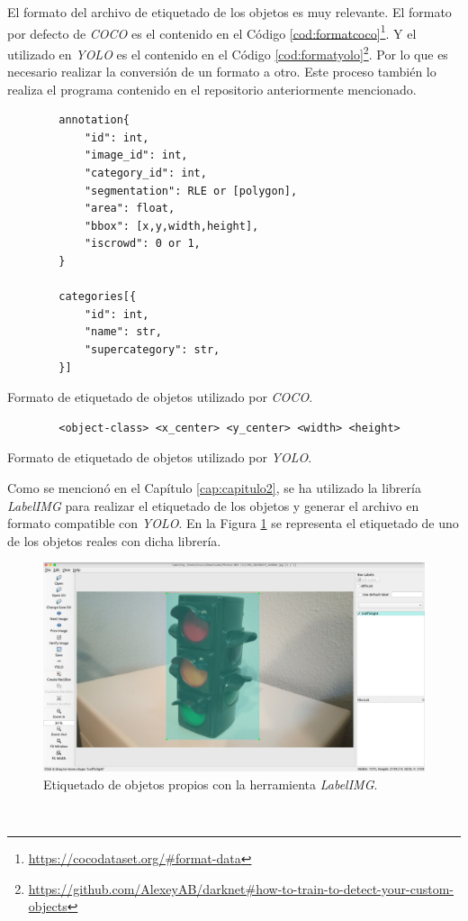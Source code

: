 El formato del archivo de etiquetado de los objetos es muy relevante. El formato por defecto de \textit{COCO} es el contenido en el Código \ref{cod:formatcoco}\footnote{\url{https://cocodataset.org/\#format-data}}. Y el utilizado en \textit{YOLO} es el contenido en el Código \ref{cod:formatyolo}\footnote{\url{https://github.com/AlexeyAB/darknet\#how-to-train-to-detect-your-custom-objects}}. Por lo que es necesario realizar la conversión de un formato a otro. Este proceso también lo realiza el programa contenido en el repositorio anteriormente mencionado.\\

\begin{code}[h]
	\begin{lstlisting}
		annotation{
			"id": int, 
			"image_id": int, 
			"category_id": int, 
			"segmentation": RLE or [polygon], 
			"area": float, 
			"bbox": [x,y,width,height], 
			"iscrowd": 0 or 1,
		}

		categories[{
			"id": int, 
			"name": str, 
			"supercategory": str,
		}]
	\end{lstlisting}
	\caption[Formato de etiquetado de objetos utilizado por \textit{COCO}.]{Formato de etiquetado de objetos utilizado por \textit{COCO}.}
	\label{cod:formatcoco}
\end{code}

\begin{code}[h]
	\begin{lstlisting}
		<object-class> <x_center> <y_center> <width> <height>
	\end{lstlisting}
	\caption[Formato de etiquetado de objetos utilizado por \textit{YOLO}.]{Formato de etiquetado de objetos utilizado por \textit{YOLO}.}
	\label{cod:formatyolo}
\end{code}

Como se mencionó en el Capítulo \ref{cap:capitulo2}, se ha utilizado la librería \textit{LabelIMG} para realizar el etiquetado de los objetos y generar el archivo en formato compatible con \textit{YOLO}. En la Figura \ref{fig:customlabelimg} se representa el etiquetado de uno de los objetos reales con dicha librería.\\
\begin{figure} [h!]
	\begin{center}
		\includegraphics[width=14cm]{figs/customlabelimg}
	\end{center}
	\caption{Etiquetado de objetos propios con la herramienta \textit{LabelIMG}.}
	\label{fig:customlabelimg}
\end{figure}\

